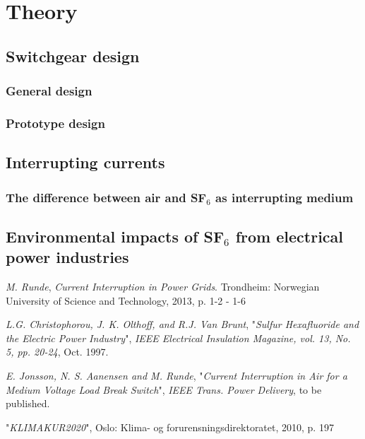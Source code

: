 \documentclass[10pt,a4paper]{article}
\begin{document}
\newpage
\section{Theory}
\subsection{Switchgear design}
\subsubsection{General design}
\subsubsection{Prototype design}
\newpage
\subsection{Interrupting currents}
\subsubsection{The difference between air and SF$_6$ as interrupting medium}
\newpage
\subsection{Environmental impacts of SF$_6$ from electrical power industries}
\newpage

\begin{thebibliography}{10}


 \textit{M. Runde}, \textit{Current Interruption in Power Grids}. Trondheim: Norwegian University of Science and Technology, 2013, p. 1-2 - 1-6

 \textit{L.G. Christophorou, J. K. Olthoff, and R.J. Van Brunt}, "\textit{Sulfur Hexafluoride and the Electric Power Industry}", \textit{IEEE Electrical Insulation Magazine, vol. 13, No. 5, pp. 20-24}, Oct. 1997.

 \textit{E. Jonsson, N. S. Aanensen and M. Runde}, "\textit{Current Interruption in Air for a Medium Voltage Load Break Switch}", \textit{IEEE Trans. Power Delivery}, to be published.

 "\textit{KLIMAKUR2020}", Oslo: Klima- og forurensningsdirektoratet, 2010, p. 197
\end{thebibliography}
\end{document}
